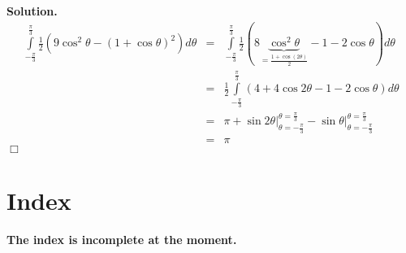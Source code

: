 \documentclass[12pt]{book}
\newenvironment{solution}{\textbf{Solution.} }{$\Box$}
\begin{document}
\begin{itemize}
\begin{solution}
\[
\begin{array}{rcl}
\displaystyle\int\limits_{-\frac{\pi}{3}}^{\frac{\pi}{3}} \frac{1}2\left(9\cos^2\theta-(1+\cos\theta)^2\right) d\theta&=& \displaystyle\int\limits_{-\frac{\pi}{3}}^{\frac{\pi}{3}} \frac{1}2\left(8\underbrace{\cos^2\theta}_{=\frac{1+\cos(2\theta)}2  }-1-2\cos\theta \right) d\theta\\
&=&\displaystyle\frac{1}2\int\limits_{-\frac{\pi}{3}}^{\frac{\pi}{3}} \left(4+4 \cos 2\theta-1-2\cos\theta \right) d\theta
\\
&=&\pi+\left.\sin2\theta\right|_{\theta=-\frac{\pi}{3}}^{\theta=\frac{\pi}3}-\left.\sin\theta\right|_{\theta=-\frac{\pi}{3}}^{\theta=\frac{\pi}3}\\
&=&\pi
\end{array}
\]
\end{solution}
\end{itemize}

\section{Index}
\textbf{The index is incomplete at the moment. }
\printindex
\end{document}
